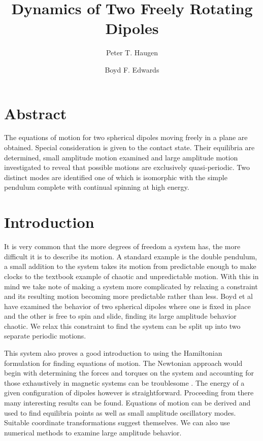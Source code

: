 \documentclass[prbg,preprint]{revtex4-1}
\begin{document}
\title{Dynamics of Two Freely Rotating Dipoles}
\author{Peter T. Haugen}
\author{Boyd F. Edwards}

\maketitle
\section{Abstract}
	The equations of motion for two spherical dipoles moving freely in a plane are obtained. Special consideration is given to the contact state. Their equilibria are determined, small amplitude motion examined and large amplitude motion investigated to reveal that possible motions are exclusively quasi-periodic.
	Two distinct modes are identified one of which is isomorphic with the simple pendulum complete with continual spinning at high energy.
	
	

\section{Introduction}
It is very common that the more degrees of freedom a system has, the more difficult it is to describe its motion. A standard example is the double pendulum, a small addition to the system takes its motion from predictable enough to make clocks to the textbook example of chaotic and unpredictable motion.
With this in mind we take note of making a system more complicated by relaxing a constraint and its resulting motion becoming more predictable rather than less. Boyd et al have examined the behavior of two spherical dipoles where one is fixed in place and the other is free to spin and slide, finding its large amplitude behavior chaotic. We relax this constraint to find the system can be split up into two separate periodic motions.

This system also proves a good introduction to using the Hamiltonian formulation for finding equations of motion. 
The Newtonian approach would begin with determining the forces and torques on the system and accounting for those exhaustively in magnetic systems can be troublesome \cite{Boyer:1988aa} \cite{Vaidman:1990aa} \cite{Griffiths:1992aa} \cite{Brownstein:1993aa}  \cite{Hnizdo:1997aa}. 
The energy of a given configuration of dipoles \cite{Greene:1971aa} however is straightforward. Proceeding from there many interesting results can be found. Equations of motion can be derived and used to find equilibria points as well as small amplitude oscillatory modes. Suitable coordinate transformations suggest themselves. We can also use numerical methods to examine large amplitude behavior.
\end{document}
